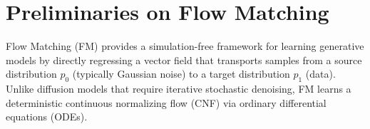 \documentclass{article}
\theoremstyle{plain}
\theoremstyle{definition}
\theoremstyle{remark}
\begin{document}







\newpage
\appendix
\onecolumn

\section{Preliminaries on Flow Matching}\label{app:flow_matching}

Flow Matching (FM) \cite{lipmanFlowMatchingGenerative2023a} provides a simulation-free framework for learning generative models by directly regressing a vector field that transports samples from a source distribution $p_0$ (typically Gaussian noise) to a target distribution $p_1$ (data). Unlike diffusion models that require iterative stochastic denoising, FM learns a deterministic continuous normalizing flow (CNF) via ordinary differential equations (ODEs).
\end{document}

